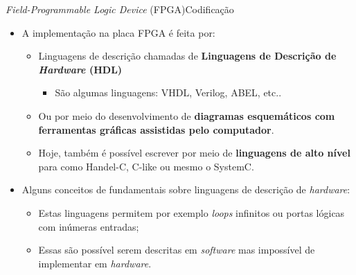     
    
    \begin{frame}{\textit{Field-Programmable Logic Device} (FPGA)}{Codificação} 
    \vspace{-0.7em}
    \begin{itemize}
        \setlength\itemsep{1.3em}
        \item A implementação na placa FPGA é feita por:
        \begin{itemize}
            \setlength\itemsep{0.5em}
            \item Linguagens de descrição chamadas de \textbf{Linguagens de Descrição de \textit{Hardware} (HDL)}
            \begin{itemize}
                \item São algumas linguagens: VHDL, Verilog, ABEL, etc..
            \end{itemize}
            
            \item Ou por meio do desenvolvimento de \textbf{diagramas esquemáticos com ferramentas gráficas assistidas pelo computador}.
            
            \item Hoje, também é possível escrever por meio de \textbf{linguagens de alto nível} para como Handel-C, C-like ou mesmo o SystemC.
        \end{itemize}
        
        \item Alguns conceitos de fundamentais sobre linguagens de descrição de \textit{hardware}:
        \begin{itemize}
            \setlength\itemsep{0.5em}
            \item Estas linguagens permitem por exemplo \textit{loops} infinitos ou portas lógicas com inúmeras entradas;
            
            \item Essas são possível serem descritas em \textit{software} mas impossível de implementar em \textit{hardware}.
        \end{itemize}
    \end{itemize}
    \end{frame}
    
